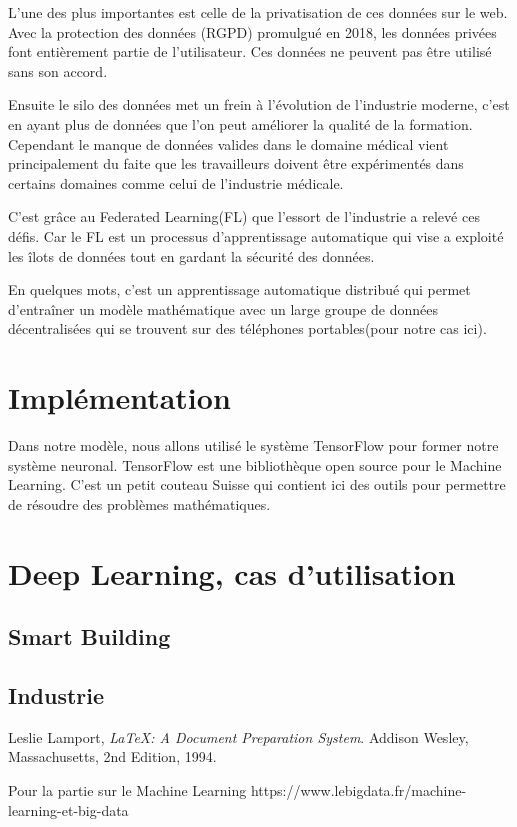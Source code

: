 \documentclass[12pt,a4paper]{report}
\begin{document}
L'une des plus importantes est celle de la privatisation de ces données sur le web. Avec la protection des données (RGPD) promulgué en 2018, les données privées font entièrement partie de l'utilisateur. Ces données ne peuvent pas être utilisé sans son accord.

Ensuite le silo des données met un frein à l'évolution de l'industrie moderne, c'est en ayant plus de données que l'on peut améliorer la qualité de la formation. Cependant le manque de données valides dans le domaine médical vient principalement du faite que les travailleurs doivent être expérimentés dans certains domaines comme celui de l'industrie médicale.

C'est grâce au Federated Learning(FL) que l'essort de l'industrie a relevé ces défis. Car le FL est un processus d'apprentissage automatique qui vise a exploité les îlots de données tout en gardant la sécurité des données.




En quelques mots, c'est un apprentissage automatique distribué qui permet d'entraîner un modèle mathématique avec un large groupe de données décentralisées qui se trouvent sur des téléphones portables(pour notre cas ici).



\section{Implémentation}
Dans notre modèle, nous allons utilisé le système TensorFlow pour former notre système neuronal. TensorFlow est une bibliothèque open source pour le Machine Learning. C'est un petit couteau Suisse qui contient ici des outils pour permettre de résoudre des problèmes mathématiques. 

\section{Deep Learning, cas d'utilisation}

\subsection{Smart Building}

\subsection{Industrie}




\begin{thebibliography}{9}

	  Leslie Lamport,
	  \emph{\LaTeX: A Document Preparation System}.
	  Addison Wesley, Massachusetts,
	  2nd Edition,
	  1994.
	  
	Pour la partie sur le Machine Learning https://www.lebigdata.fr/machine-learning-et-big-data

\end{thebibliography}
\end{document}
